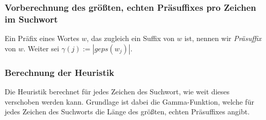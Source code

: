 \subsubsection{Vorberechnung des größten, echten Präsuffixes pro Zeichen im Suchwort}
Ein Präfix eines Wortes \(w\), das zugleich ein Suffix von \(w\) ist, nennen wir \textit{Präsuffix} von \(w\). Weiter sei \(\gamma(j) := | geps(w_j)|\).

\subsubsection{Berechnung der Heuristik}
Die Heuristik berechnet für jedes Zeichen des Suchwort, wie weit dieses verschoben werden kann. Grundlage ist dabei die Gamma-Funktion, welche für jedes Zeichen des Suchworts die Länge des größten, echten Präsuffixes angibt.
\text{}\\

